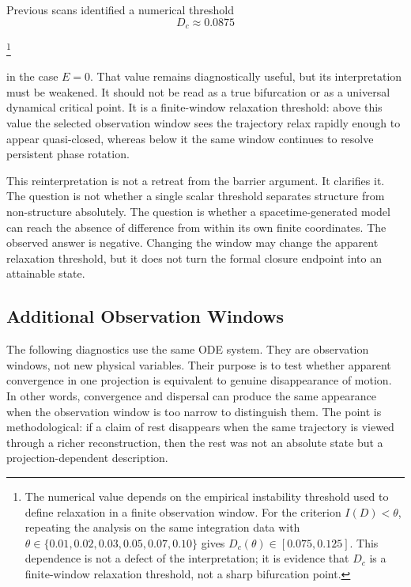 Previous scans identified a numerical threshold
\begin{equation}
  D_c\approx0.0875
\end{equation}%
\begin{NoHyper}\footnote{%
The numerical value depends on the empirical instability threshold
used to define relaxation in a finite observation window.
For the criterion $I(D)<\theta$,
repeating the analysis on the same integration data with
$\theta\in\{0.01,0.02,0.03,0.05,0.07,0.10\}$
gives $D_c(\theta)\in[0.075,0.125]$.
This dependence is not a defect of the interpretation;
it is evidence that $D_c$ is a finite-window relaxation threshold,
not a sharp bifurcation point.%
}\end{NoHyper}
in the case $E=0$.
That value remains diagnostically useful,
but its interpretation must be weakened.
It should not be read as a true bifurcation or as a universal dynamical
critical point.
It is a finite-window relaxation threshold:
above this value the selected observation window sees the trajectory
relax rapidly enough to appear quasi-closed,
whereas below it the same window continues to resolve persistent
phase rotation.

This reinterpretation is not a retreat from the barrier argument.
It clarifies it.
The question is not whether a single scalar threshold separates
structure from non-structure absolutely.
The question is whether a spacetime-generated model can reach the
absence of difference from within its own finite coordinates.
The observed answer is negative.
Changing the window may change the apparent relaxation threshold,
but it does not turn the formal closure endpoint into an attainable
state.

\subsection{Additional Observation Windows}

The following diagnostics use the same ODE system.
They are observation windows, not new physical variables.
Their purpose is to test whether apparent convergence in one projection
is equivalent to genuine disappearance of motion.
In other words,
convergence and dispersal can produce the same appearance when the
observation window is too narrow to distinguish them.
The point is methodological:
if a claim of rest disappears when the same trajectory is viewed
through a richer reconstruction,
then the rest was not an absolute state but a projection-dependent
description.

